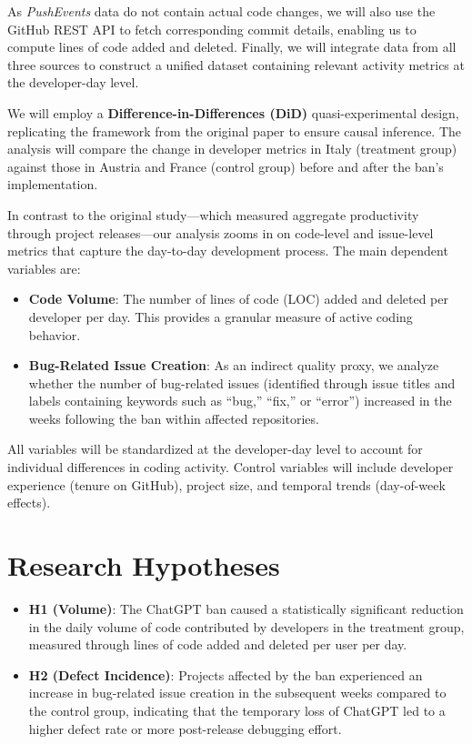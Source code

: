 As \textit{PushEvents} data do not contain actual code changes, we will also use the GitHub REST API to fetch corresponding commit details, enabling us to compute lines of code added and deleted. Finally, we will integrate data from all three sources to construct a unified dataset containing relevant activity metrics at the developer-day level.


We will employ a \textbf{Difference-in-Differences (DiD)} quasi-experimental design, replicating the framework from the original paper to ensure causal inference. The analysis will compare the change in developer metrics in Italy (treatment group) against those in Austria and France (control group) before and after the ban's implementation.

In contrast to the original study—which measured aggregate productivity through project releases—our analysis zooms in on code-level and issue-level metrics that capture the day-to-day development process. The main dependent variables are:

\begin{itemize}
  \item \textbf{Code Volume}: The number of lines of code (LOC) added and deleted per developer per day. This provides a granular measure of active coding behavior.
  \item \textbf{Bug-Related Issue Creation}: As an indirect quality proxy, we analyze whether the number of bug-related issues (identified through issue titles and labels containing keywords such as “bug,” “fix,” or “error”) increased in the weeks following the ban within affected repositories.
\end{itemize}

All variables will be standardized at the developer-day level to account for individual differences in coding activity. Control variables will include developer experience (tenure on GitHub), project size, and temporal trends (day-of-week effects).


\section*{Research Hypotheses}

\begin{itemize}
  \item \textbf{H1 (Volume)}: The ChatGPT ban caused a statistically significant reduction in the daily volume of code contributed by developers in the treatment group, measured through lines of code added and deleted per user per day.
  \item \textbf{H2 (Defect Incidence)}: Projects affected by the ban experienced an increase in bug-related issue creation in the subsequent weeks compared to the control group, indicating that the temporary loss of ChatGPT led to a higher defect rate or more post-release debugging effort.
\end{itemize}


